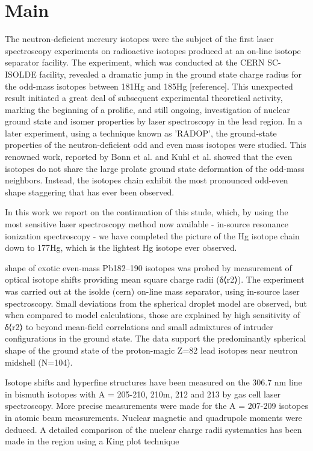 \section{Main} 


The neutron-deficient mercury isotopes were the subject of the first laser spectroscopy experiments on radioactive isotopes produced at an on-line isotope separator facility.  The experiment, which was conducted at the CERN SC-ISOLDE facility, revealed a dramatic jump in the ground state charge radius for the odd-mass isotopes between 181Hg and 185Hg [reference].  This unexpected result initiated a great deal of subsequent experimental theoretical activity, marking the beginning of a prolific, and still ongoing, investigation of nuclear ground state and isomer properties by laser spectroscopy in the lead region.  In a later experiment, using a technique known as 'RADOP', the ground-state properties of the neutron-deficient odd and even mass isotopes were studied.  This renowned work, reported by Bonn et al. and Kuhl et al. showed that the even isotopes do not share the large prolate ground state deformation of the odd-mass neighbors.  Instead, the isotopes chain exhibit the most pronounced odd-even shape staggering that has ever been observed.

In this work we report on the continuation of this stude, which, by using the most sensitive laser spectroscopy method now available - in-source resonance ionization spectroscopy - we have completed the picture of the Hg isotope chain down to 177Hg, which is the lightest Hg isotope ever observed.

shape of exotic even-mass Pb182–190 isotopes was probed by measurement of optical isotope shifts providing mean square charge radii (δ⟨r2⟩). The experiment was carried out at the isolde (cern) on-line mass separator, using in-source laser spectroscopy. Small deviations from the spherical droplet model are observed, but when compared to model calculations, those are explained by high sensitivity of δ⟨r2⟩ to beyond mean-field correlations and small admixtures of intruder configurations in the ground state. The data support the predominantly spherical shape of the ground state of the proton-magic Z=82 lead isotopes near neutron midshell (N=104).


Isotope shifts and hyperfine structures have been measured on the 306.7 nm line in bismuth isotopes with A = 205-210, 210m, 212 and 213 by gas cell laser spectroscopy. More precise measurements were made for the A = 207-209 isotopes in atomic beam measurements. Nuclear magnetic and quadrupole moments were deduced. A detailed comparison of the nuclear charge radii systematics has been made in the region using a King plot technique

